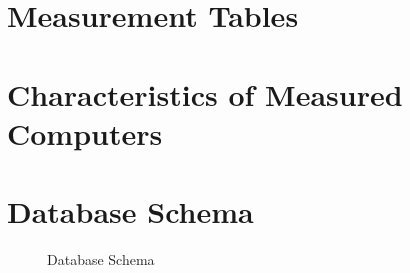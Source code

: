


    \section{Measurement Tables}\label{app:table_toolino}
    
    \section{Characteristics of Measured Computers} \label{app:characteristics_measured_computers}


    \section{Database Schema}\label{app:database schema}
        \begin{sidewaysfigure}[htbp]
            \centering
            \caption{Database Schema}
            \label{fig:database_schema}
        \end{sidewaysfigure}


